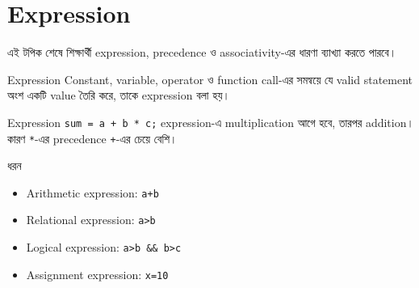 \section{Expression}

\begin{learningbox}
এই টপিক শেষে শিক্ষার্থী expression, precedence ও associativity-এর ধারণা ব্যাখ্যা করতে পারবে।
\end{learningbox}

\begin{definitionbox}{Expression}
Constant, variable, operator ও function call-এর সমন্বয়ে যে valid statement অংশ একটি value তৈরি করে, তাকে expression বলা হয়।
\end{definitionbox}

\begin{examplebox}{Expression}
\texttt{sum = a + b * c;} expression-এ multiplication আগে হবে, তারপর addition। কারণ \texttt{*}-এর precedence \texttt{+}-এর চেয়ে বেশি।
\end{examplebox}

\begin{keypointbox}{ধরন}
\begin{itemize}
\item Arithmetic expression: \texttt{a+b}
\item Relational expression: \texttt{a>b}
\item Logical expression: \texttt{a>b \&\& b>c}
\item Assignment expression: \texttt{x=10}
\end{itemize}
\end{keypointbox}

